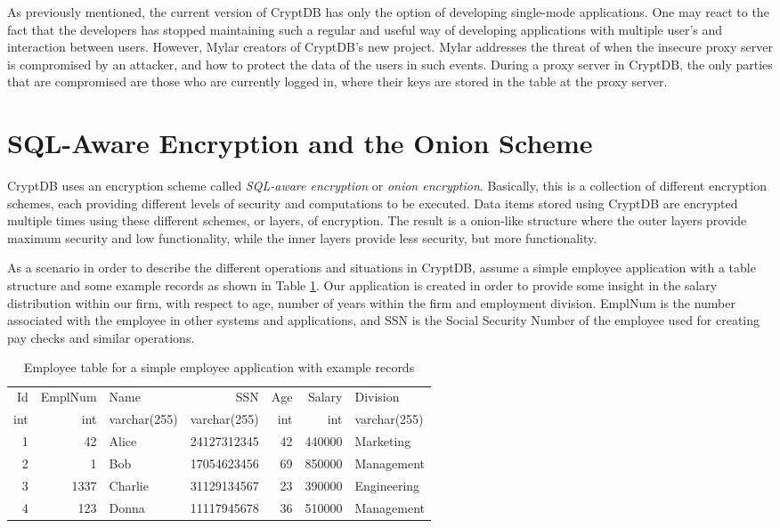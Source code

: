 As previously mentioned, the current version of CryptDB has only the option of developing single-mode applications. One may react to the fact that the developers has stopped maintaining such a regular and useful way of developing applications with multiple user's and interaction between users. However, Mylar \cite{mylar_homepage} creators of CryptDB's new project. Mylar addresses the threat of when the insecure proxy server is compromised by an attacker, and how to protect the data of the users in such events. During a proxy server in CryptDB, the only parties that are compromised are those who are currently logged in, where their keys are stored in the table at the proxy server.

\section{SQL-Aware Encryption and the Onion Scheme}

CryptDB uses an encryption scheme called \emph{SQL-aware encryption} or \textit{onion encryption}. Basically, this is a collection of different encryption schemes, each providing different levels of security and computations to be executed. Data items stored using CryptDB are encrypted multiple times using these different schemes, or layers, of encryption. The result is a onion-like structure where the outer layers provide maximum security and low functionality, while the inner layers provide less security, but more functionality.

As a scenario in order to describe the different operations and situations in CryptDB, assume a simple employee application with a table structure and some example records as shown in Table \ref{demoapp_table}. Our application is created in order to provide some insight in the salary distribution within our firm, with respect to age, number of years within the firm and employment division. EmplNum is the number associated with the employee in other systems and applications, and SSN is the Social Security Number of the employee used for creating pay checks and similar operations.

\begin{table}[H]
\centering
\begin{tabular}{| r | r | l | r | r | r | l |}
\hline
  Id & EmplNum & Name & SSN & Age & Salary & Division \\
  int & int & varchar(255) & varchar(255) & int & int & varchar(255) \\
 \hline \hline
 1 & 42 & Alice & 24127312345 & 42 & 440000 & Marketing \\
 2 & 1 & Bob & 17054623456 & 69 & 850000 & Management \\
 3 & 1337 & Charlie & 31129134567 & 23 & 390000 & Engineering \\
 4 & 123 & Donna & 11117945678 & 36 & 510000 & Management \\
 \hline

\end{tabular}
\caption{Employee table for a simple employee application with example records}
\label{demoapp_table}
\end{table}


